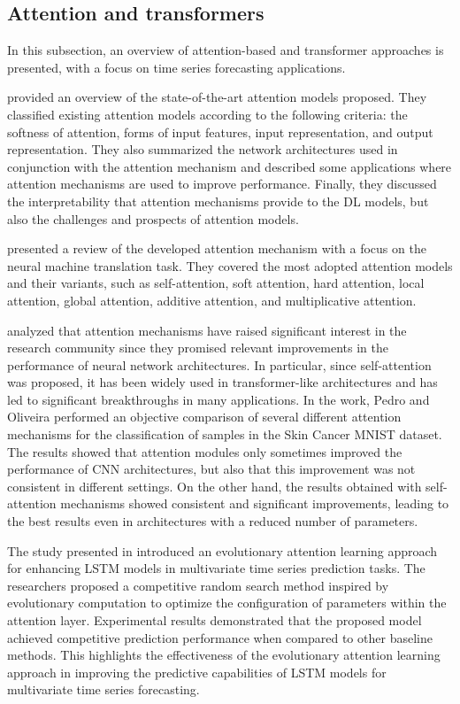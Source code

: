 \vspace{0.1 cm}
\subsection{Attention and transformers}
\label{sec:transformers}
\vspace{0.1 cm}

In this subsection, an overview of attention-based and transformer approaches is presented, with a focus on time series forecasting applications.

\cite{NIU202148} provided an overview of the state-of-the-art attention models proposed.
They classified existing attention models according to the following criteria: the softness of attention, forms of input features, input representation, and output representation.
They also summarized the network architectures used in conjunction with the attention mechanism and described some applications where attention mechanisms are used to improve performance.
Finally, they discussed the interpretability that attention mechanisms provide to the DL models, but also the challenges and prospects of attention models.

\cite{9586824} presented a review of the developed attention mechanism with a focus on the neural machine translation task.
They covered the most adopted attention models and their variants, such as self-attention, soft attention, hard attention, local attention, global attention, additive attention, and multiplicative attention.

\cite{9892274} analyzed that attention mechanisms have raised significant interest in the research community since they promised relevant improvements in the performance of neural network architectures.
In particular, since self-attention was proposed, it has been widely used in transformer-like architectures and has led to significant breakthroughs in many applications.
In the work, Pedro and Oliveira performed an objective comparison of several different attention mechanisms for the classification of samples in the Skin Cancer MNIST dataset.
The results showed that attention modules only sometimes improved the performance of CNN architectures, but also that this improvement was not consistent in different settings.
On the other hand, the results obtained with self-attention mechanisms showed consistent and significant improvements, leading to the best results even in architectures with a reduced number of parameters.

The study presented in \cite{LI2019104785} introduced an evolutionary attention learning approach for enhancing LSTM models in multivariate time series prediction tasks.
The researchers proposed a competitive random search method inspired by evolutionary computation to optimize the configuration of parameters within the attention layer.
Experimental results demonstrated that the proposed model achieved competitive prediction performance when compared to other baseline methods.
This highlights the effectiveness of the evolutionary attention learning approach in improving the predictive capabilities of LSTM models for multivariate time series forecasting.

